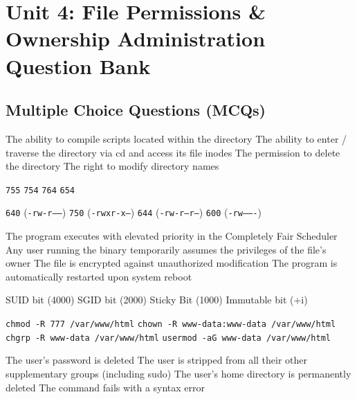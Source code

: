 \chapter{Unit 4: File Permissions \& Ownership Administration Question Bank}

\section{Multiple Choice Questions (MCQs)}

{The ability to compile scripts located within the directory}
{The ability to enter / traverse the directory via cd and access its file inodes}
{The permission to delete the directory}
{The right to modify directory names}

{\texttt{755}}
{\texttt{754}}
{\texttt{764}}
{\texttt{654}}

{\texttt{640} (\texttt{-rw-r-----})}
{\texttt{750} (\texttt{-rwxr-x---})}
{\texttt{644} (\texttt{-rw-r--r--})}
{\texttt{600} (\texttt{-rw-------})}

{The program executes with elevated priority in the Completely Fair Scheduler}
{Any user running the binary temporarily assumes the privileges of the file's owner}
{The file is encrypted against unauthorized modification}
{The program is automatically restarted upon system reboot}

{SUID bit (4000)}
{SGID bit (2000)}
{Sticky Bit (1000)}
{Immutable bit (+i)}

{\texttt{chmod -R 777 /var/www/html}}
{\texttt{chown -R www-data:www-data /var/www/html}}
{\texttt{chgrp -R www-data /var/www/html}}
{\texttt{usermod -aG www-data /var/www/html}}

{The user's password is deleted}
{The user is stripped from all their other supplementary groups (including sudo)}
{The user's home directory is permanently deleted}
{The command fails with a syntax error}

